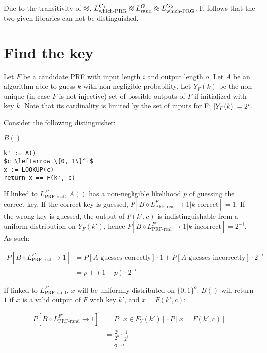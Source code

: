 \documentclass[a4paper]{scrreprt}
\DeclarePairedDelimiter\abs{\lvert}{\rvert}
\newcommand*{\diffeo}{%
  \mathrel{\vcenter{\offinterlineskip
  \hbox{$\sim$}\vskip-.35ex\hbox{$\sim$}\vskip-.35ex\hbox{$\sim$}}}}
\begin{document}
Due to the transitivity of $\diffeo$, $L^{G_1}_{\text{which-PRG}} \diffeo
L^{G}_{\text{rand}} \diffeo L^{G_2}_{\text{which-PRG}}$. It follows that the
two given libraries can not be distinguished.

\section{Find the key}

Let $F$ be a candidate PRF with input length $i$ and output length $o$. Let $A$
be an algorithm able to guess $k$ with non-negligible probability. Let $Y_F(k)$
be the non-unique (in case $F$ is not injective) set of possible outputs of $F$
if initialized with key $k$. Note that its cardinality is limited by the set of
inputs for F: $\abs{Y_F(k)} = 2^i$.

Consider the following distinguisher:

\begin{library}{$B()$}
	\begin{lstlisting}[mathescape=true]
k' := A()
$c \leftarrow \{0, 1\}^i$
x := LOOKUP(c)
return x == F(k', c)
	\end{lstlisting}
\end{library}

If linked to $L^{F'}_{\text{PRF-real}}$, $A()$ has a non-negligible likelihood
$p$ of guessing the correct key. If the correct key is guessed, $P[B \diamond
L^{F'}_{\text{PRF-real}} \rightarrow 1 | k \text{ correct}] = 1$. If the wrong
key is guessed, the output of $F(k', c)$ is indistinguishable from a uniform
distribution on $Y_F(k')$, hence $P[B \diamond L^{F'}_{\text{PRF-real}}
\rightarrow 1 | k \text{ incorrect}] = 2^{-i}$. As such:

\begin{align*}
	P[B \diamond L^{F'}_{\text{PRF-real}} \rightarrow 1] & = P[A \text{ guesses correctly}] \cdot 1 + P[A \text{ guesses incorrectly}] \cdot 2^{-i} \\
							     & = p + (1 - p) \cdot 2^{-i}
\end{align*}

If linked to $L^{F'}_{\text{PRF-rand}}$, $x$ will be uniformly distributed on
$\{0, 1\}^o$. $B()$ will return $1$ if $x$ is a valid output of $F$ with key
$k'$, and $x = F(k', c)$:

\begin{align*}
	P[B \diamond L^{F'}_{\text{PRF-rand}} \rightarrow 1] & = P[x \in F_Y(k')] \cdot P[x = F(k', c)] \\
							     & = \frac{2^i}{2^o} \cdot \frac{1}{2^i} \\
							     & = 2^{-o}
\end{align*}
\end{document}
